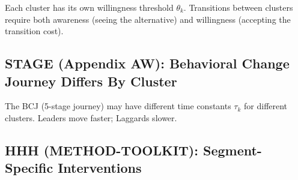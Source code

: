 Each cluster has its own willingness threshold $\theta_k$. Transitions between
clusters require both awareness (seeing the alternative) and willingness
(accepting the transition cost).

\subsection{STAGE (Appendix AW): Behavioral Change Journey Differs By Cluster}

The BCJ (5-stage journey) may have different time constants $\tau_k$ for
different clusters. Leaders move faster; Laggards slower.

\subsection{HHH (METHOD-TOOLKIT): Segment-Specific Interventions}
\label{sec:ba-hhh-integration}

